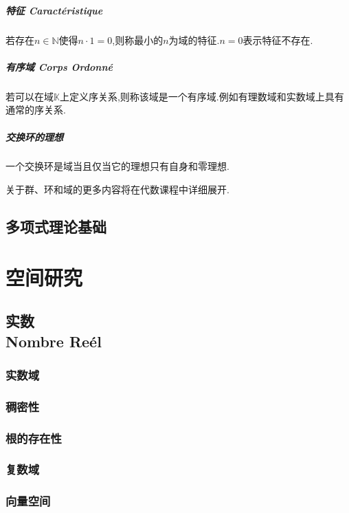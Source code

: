 \documentclass[12pt, a4paper, oneside]{ctexbook}
\begin{document}
  \subsubsection{特征 Caractéristique}    \label{myref:tezheng}
  若存在$n\in \mathbb{N}$使得$n\cdot 1=0$,则称最小的$n$为域的特征.$n=0$表示特征不存在.
  \subsubsection{有序域 Corps Ordonné}
  若可以在域$\mathbb{K}$上定义序关系,则称该域是一个有序域.例如有理数域和实数域上具有通常的序关系.
  \subsubsection{交换环的理想}
  一个交换环是域当且仅当它的理想只有自身和零理想.



  关于群、环和域的更多内容将在代数课程中详细展开.
  \chapter{多项式理论基础}





\part{空间研究}
\chapter{实数\\ Nombre Reél}%
  \section{实数域}
  \section{稠密性}
  \section{根的存在性}
  \section{复数域}
  \section{向量空间}
\end{document}
